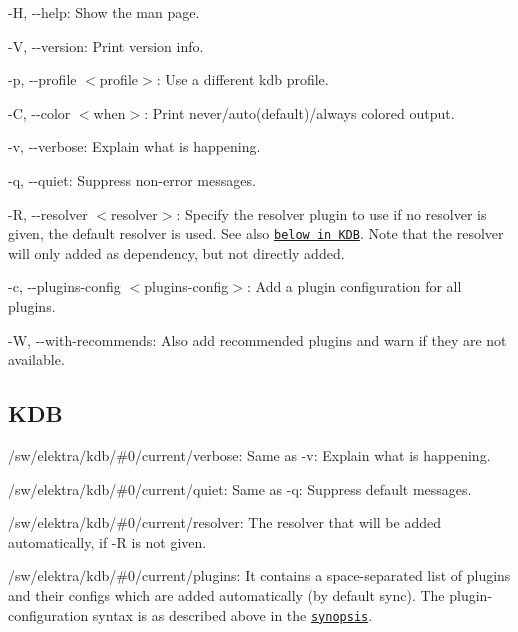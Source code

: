 \begin{DoxyItemize}
\item {\ttfamily -\/H}, {\ttfamily -\/-\/help}\+: Show the man page.
\item {\ttfamily -\/V}, {\ttfamily -\/-\/version}\+: Print version info.
\item {\ttfamily -\/p}, {\ttfamily -\/-\/profile $<$profile$>$}\+: Use a different kdb profile.
\item {\ttfamily -\/C}, {\ttfamily -\/-\/color $<$when$>$}\+: Print never/auto(default)/always colored output.
\item {\ttfamily -\/v}, {\ttfamily -\/-\/verbose}\+: Explain what is happening.
\item {\ttfamily -\/q}, {\ttfamily -\/-\/quiet}\+: Suppress non-\/error messages.
\item {\ttfamily -\/R}, {\ttfamily -\/-\/resolver $<$resolver$>$}\+: Specify the resolver plugin to use if no resolver is given, the default resolver is used. See also \href{#KDB}{\tt below in K\+DB}. Note that the resolver will only added as dependency, but not directly added.
\item {\ttfamily -\/c}, {\ttfamily -\/-\/plugins-\/config $<$plugins-\/config$>$}\+: Add a plugin configuration for all plugins.
\item {\ttfamily -\/W}, {\ttfamily -\/-\/with-\/recommends}\+: Also add recommended plugins and warn if they are not available.
\end{DoxyItemize}

\subsection*{K\+DB}


\begin{DoxyItemize}
\item {\ttfamily /sw/elektra/kdb/\#0/current/verbose}\+: Same as {\ttfamily -\/v}\+: Explain what is happening.
\item {\ttfamily /sw/elektra/kdb/\#0/current/quiet}\+: Same as {\ttfamily -\/q}\+: Suppress default messages.
\item {\ttfamily /sw/elektra/kdb/\#0/current/resolver}\+: The resolver that will be added automatically, if {\ttfamily -\/R} is not given.
\item {\ttfamily /sw/elektra/kdb/\#0/current/plugins}\+: It contains a space-\/separated list of plugins and their configs which are added automatically (by default sync). The plugin-\/configuration syntax is as described above in the \href{#SYNOPSIS}{\tt synopsis}.
\end{DoxyItemize}

